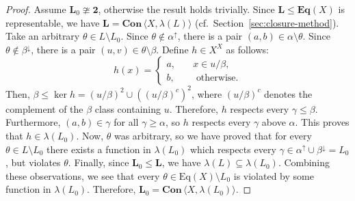 \documentclass[cm,dissertation]{uhthesis}
\theoremstyle{plain}
\theoremstyle{definition}
\theoremstyle{remark}
\numberwithin{theorem}{section}
\numberwithin{claim}{chapter}
\numberwithin{equation}{section}
\numberwithin{conjecture}{chapter}
\newcommand{\<}{\ensuremath{\langle}}
\renewcommand{\>}{\ensuremath{\rangle}}
\renewcommand{\leq}{\ensuremath{\leqslant}}
\renewcommand{\geq}{\ensuremath{\geqslant}}
\newcommand{\Eq}{\ensuremath{\mathrm{Eq}}}
\newcommand{\bEqX}{\ensuremath{\mathbf{Eq}(X)}}
\newcommand{\bCon}{\ensuremath{\mathbf{Con\,}}}
\newcommand{\0}{\ensuremath{\mathbf{0}}}
\newcommand{\1}{\ensuremath{\mathbf{1}}}
\newcommand{\2}{\ensuremath{\mathbf{2}}}
\newcommand{\3}{\ensuremath{\mathbf{3}}}
\newcommand{\4}{\ensuremath{\mathbf{4}}}
\newcommand{\5}{\ensuremath{\mathbf{5}}}
\newcommand{\bL}{\ensuremath{\mathbf{L}}}
\newcommand{\upalpha}{\ensuremath{\alpha^{\uparrow}}}
\newcommand{\downbeta}{\ensuremath{\beta^{\downarrow}}}
\newcommand{\two}{\ensuremath{\mathbf{2}}}
\begin{document}
      \begin{center}
      \end{center}

\vskip3mm

\begin{proof}
Assume $\bL_0 \ncong \two$, otherwise the result holds trivially. 
Since $\bL\leq \bEqX$ is representable, we have $\bL = \bCon
\<X, \lambda(L)\>$ (cf.~Section~\ref{sec:closure-method}).  Take an arbitrary
$\theta \in L \setminus L_0$. Since $\theta \notin \upalpha$, 
there is a pair 
$(a,b) \in \alpha \setminus \theta$.  Since $\theta \notin \downbeta$, there is
a pair $(u,v)\in \theta\setminus \beta$. Define $h\in X^X$ as follows:
\begin{equation*}
h(x) = \begin{cases}
a,& \quad x\in u/\beta,\\
b,& \quad \text{ otherwise.}
\end{cases}
\end{equation*}
Then, $\beta \leq \ker h = (u/\beta)^2 \cup ((u/\beta)^c)^2$, where $(u/\beta)^c$ denotes the
complement of the $\beta$ class containing $u$.  Therefore, $h$ respects every
$\gamma \leq \beta$.  Furthermore, $(a, b) \in \gamma$ for all $\gamma \geq \alpha$,
so $h$ respects every $\gamma$ above $\alpha$.  This proves that $h\in \lambda(L_0)$.
Now, $\theta$ was arbitrary, so we have proved that for every $\theta \in L
\setminus L_0$ there exists a function in $\lambda(L_0)$ which respects every
$\gamma \in \upalpha\cup \downbeta = L_0$, but violates $\theta$.  Finally,
since 
$\bL_0 \leq \bL$, we have $\lambda(L)\subseteq \lambda(L_0)$.  Combining these
observations, we see that every $\theta \in \Eq(X) \setminus L_0$ is
violated by some function in $\lambda(L_0)$. Therefore, $\bL_0 = \bCon \< X, \lambda(L_0)\>$.
\end{proof}
\end{document}
